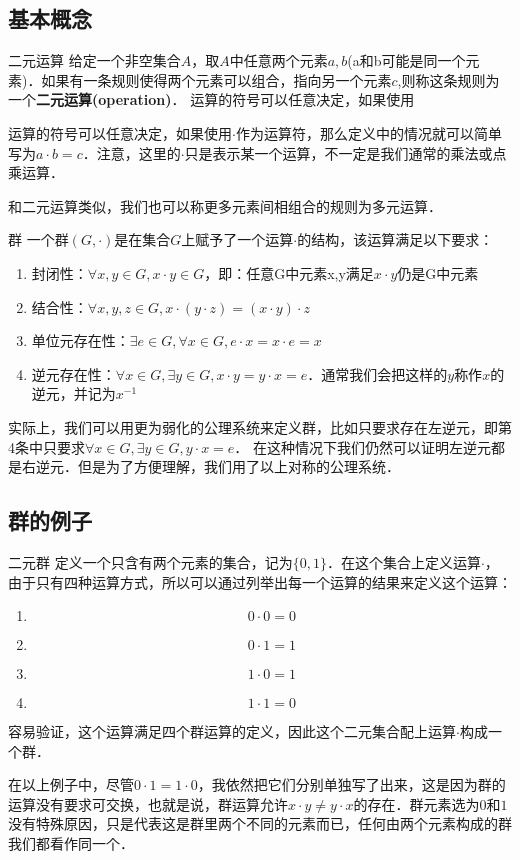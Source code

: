 
\subsection{基本概念}

\begin{definition}{二元运算}
给定一个非空集合$A$，取$A$中任意两个元素$a, b$(a和b可能是同一个元素)．如果有一条规则使得两个元素可以组合，指向另一个元素$c$,则称这条规则为一个\textbf{二元运算(operation)}． 运算的符号可以任意决定，如果使用
\end{definition}

运算的符号可以任意决定，如果使用$\cdot$作为运算符，那么定义中的情况就可以简单写为$a· b=c$．注意，这里的$\cdot$只是表示某一个运算，不一定是我们通常的乘法或点乘运算．

和二元运算类似，我们也可以称更多元素间相组合的规则为多元运算．

\begin{definition}{群}
一个群$(G, \cdot)$是在集合$G$上赋予了一个运算$\cdot$的结构，该运算满足以下要求：\\

\begin{enumerate}
\item 封闭性：$∀x, y∈ G, x· y∈ G$，即：任意G中元素x,y满足$x· y$仍是G中元素
\item 结合性：$∀ x, y, z\in G, x·(y· z)=(x· y)· z$
\item 单位元存在性：$∃ e\in G, ∀ x∈ G, e· x=x· e=x$
\item 逆元存在性：$∀ x∈ G, ∃ y∈ G, x· y=y· x=e$．通常我们会把这样的$y$称作$x$的逆元，并记为$x^{-1}$
\end{enumerate}

\end{definition}

实际上，我们可以用更为弱化的公理系统来定义群，比如只要求存在左逆元，即第4条中只要求$∀ x∈ G, ∃ y∈ G, y· x=e$． 在这种情况下我们仍然可以证明左逆元都是右逆元．但是为了方便理解，我们用了以上对称的公理系统．

\subsection{群的例子}


\begin{example}{二元群}\label{Group_ex1}
定义一个只含有两个元素的集合，记为$\{0, 1\}$．在这个集合上定义运算$\cdot$，由于只有四种运算方式，所以可以通过列举出每一个运算的结果来定义这个运算：
\begin{enumerate}
\item $$0\cdot0=0$$
\item $$0\cdot1=1$$
\item $$1\cdot0=1$$
\item $$1\cdot1=0$$
\end{enumerate}



容易验证，这个运算满足四个群运算的定义，因此这个二元集合配上运算$\cdot$构成一个群．

\end{example}

在以上例子中，尽管$0\cdot1=1\cdot0$，我依然把它们分别单独写了出来，这是因为群的运算没有要求可交换，也就是说，群运算允许$x\cdot y\neq y\cdot x$的存在．群元素选为$0$和$1$没有特殊原因，只是代表这是群里两个不同的元素而已，任何由两个元素构成的群我们都看作同一个．